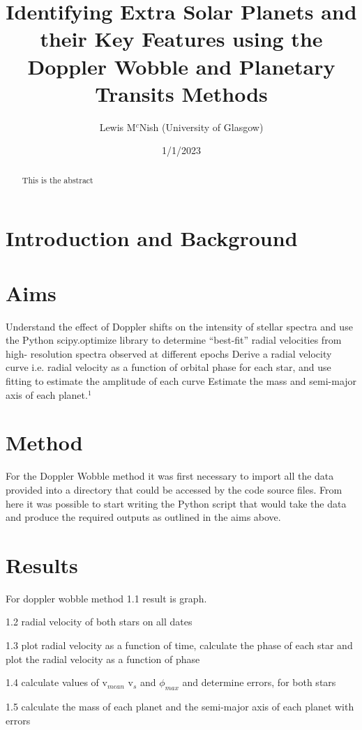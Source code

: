 \documentclass[]{article}
\title{\textbf{Identifying Extra Solar Planets and their Key Features using the Doppler Wobble and Planetary Transits Methods}}
\author{Lewis M$^{c}$Nish (University of Glasgow)}
\date{1/1/2023}
\begin{document}
\maketitle

\begin{abstract}
This is the abstract

\end{abstract}
\newpage



\twocolumn
\section*{Introduction and Background}

\section*{Aims}
Understand the effect of Doppler shifts on the intensity of stellar spectra and use the Python scipy.optimize library to determine “best-fit” radial velocities from high- resolution spectra observed at different epochs
Derive a radial velocity curve i.e. radial velocity as a function of orbital phase for each star, and use fitting to estimate the amplitude of each curve 
Estimate the mass and semi-major axis of each planet.$^1$

\section*{Method}
For the Doppler Wobble method it was first necessary to 
import all the data provided into a directory that could be 
accessed by the code source files. From here it was possible to start
writing the Python script that would take the data and produce the required outputs as outlined in the aims above.




\section*{Results}
For doppler wobble method 1.1 result is graph. \par
1.2 radial velocity of both stars on all dates\par
1.3 plot radial velocity as a function of time, calculate the phase
of each star and plot the radial velocity as a function of phase\par
1.4 calculate values of v$_{mean}$ v$_{s}$ and $\phi_{max}$ and determine errors,
for both stars\par
1.5 calculate the mass of each planet and the semi-major axis of each planet with errors\par
\end{document}
